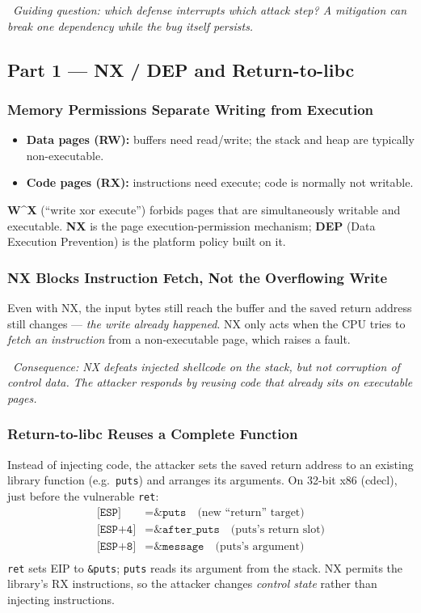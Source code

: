 \documentclass[hidelinks]{article}
\newcommand{\callout}[1]{\par\smallskip\noindent{\color{capri}$\blacktriangleright$}\ \textit{#1}\par\smallskip}
\begin{document}
\callout{Guiding question: \emph{which defense interrupts which attack step?} A mitigation can break one dependency while the bug itself persists.}

\subsection{Part 1 --- NX / DEP and Return-to-libc}

\subsubsection{Memory Permissions Separate Writing from Execution}

\begin{itemize}
    \item \textbf{Data pages (RW):} buffers need read/write; the stack and heap are typically non-executable.
    \item \textbf{Code pages (RX):} instructions need execute; code is normally not writable.
\end{itemize}
\textbf{W\textasciicircum X} (``write xor execute'') forbids pages that are simultaneously writable and executable. \textbf{NX} is the page execution-permission mechanism; \textbf{DEP} (Data Execution Prevention) is the platform policy built on it.

\subsubsection{NX Blocks Instruction Fetch, Not the Overflowing Write}

Even with NX, the input bytes still reach the buffer and the saved return address still changes --- \emph{the write already happened}. NX only acts when the CPU tries to \emph{fetch an instruction} from a non-executable page, which raises a fault.

\callout{Consequence: NX defeats \emph{injected shellcode} on the stack, but not corruption of control data. The attacker responds by reusing code that already sits on executable pages.}

\subsubsection{Return-to-libc Reuses a Complete Function}

Instead of injecting code, the attacker sets the saved return address to an existing library function (e.g.\ \texttt{puts}) and arranges its arguments. On 32-bit x86 (cdecl), just before the vulnerable \texttt{ret}:
\[
\begin{array}{ll}
\texttt{[ESP]}   & = \texttt{\&puts} \quad\text{(new ``return'' target)}\\
\texttt{[ESP+4]} & = \texttt{\&after\_puts} \quad\text{(puts's return slot)}\\
\texttt{[ESP+8]} & = \texttt{\&message} \quad\text{(puts's argument)}\\
\end{array}
\]
\texttt{ret} sets EIP to \texttt{\&puts}; \texttt{puts} reads its argument from the stack. NX permits the library's RX instructions, so the attacker changes \emph{control state} rather than injecting instructions.
\end{document}
